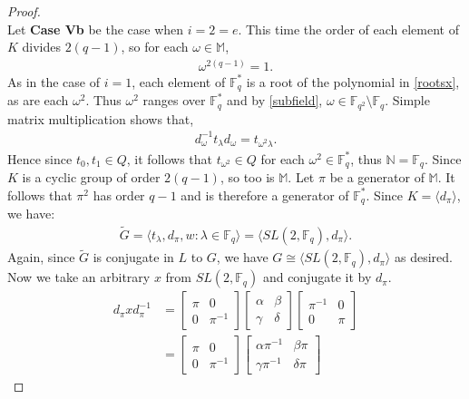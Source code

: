 \documentclass[a4paper , 11pt]{book}
\theoremstyle{definition}
\theoremstyle{remark}
\begin{document}
\begin{proof}
\\
Let \textbf{Case Vb} be the case when $i = 2 = e$. This time the order of each element of $K$ divides $2(q-1)$, so for each $\omega \in \mathbb{M}$,
\begin{align}\label{roots} \omega^{2(q-1)} = 1.
\end{align}
As in the case of $i=1$, each element of $\mathbb{F}^*_q$ is a root of the polynomial in \eqref{rootsx}, as are each $\omega^2$. Thus $\omega^2$ ranges over $\mathbb{F}^*_q$ and by \eqref{subfield}, $\omega \in \mathbb{F}_{q^2} \setminus \mathbb{F}_q$. Simple matrix multiplication shows that, \\
\begin{align*} d_\omega^{-1} t_\lambda d_\omega = t_{\omega^2 \lambda}.
\end{align*}
Hence since $t_0, t_1 \in Q$, it follows that $t_{\omega^2} \in Q$ for each $\omega^2 \in \mathbb{F}^*_q$, thus $\mathbb{N} = \mathbb{F}_q$. Since $K$ is a cyclic group of order $2(q-1)$, so too is $\mathbb{M}$. Let $\pi$ be a generator of $\mathbb{M}$. It follows that $\pi^2$ has order $q-1$ and is therefore a generator of $\mathbb{F}^*_q$. Since $K = \langle d_\pi \rangle$, we have:
\begin{align*} {\widetilde{G}} = \langle t_\lambda, d_\pi, w : \lambda \in \mathbb{F}_q \rangle = \langle SL(2,\mathbb{F}_q), d_\pi \rangle.
\end{align*}
Again, since ${\widetilde{G}}$ is conjugate in $L$ to $G$, we have $G \cong \langle SL(2,\mathbb{F}_q), d_\pi \rangle$ as desired. Now we take an arbitrary $x$ from $SL(2,\mathbb{F}_q)$ and conjugate it by $d_\pi$.
\begin{align*} d_\pi x d_\pi^{-1} &= \begin{bmatrix} \pi & 0 \\ 0 & \pi^{-1} \end{bmatrix} \begin{bmatrix} \alpha & \beta \\ \gamma & \delta \end{bmatrix}\begin{bmatrix} \pi^{-1} & 0 \\ 0 & \pi \end{bmatrix}
\\[1.5ex] &=  \begin{bmatrix} \pi & 0 \\ 0 & \pi^{-1} \end{bmatrix}  \begin{bmatrix} \alpha \pi^{-1} & \beta \pi \\ \gamma \pi^{-1} & \delta \pi \end{bmatrix}

\end{align*}
\end{proof}
\end{document}
